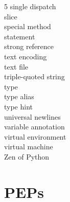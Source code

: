 \documentclass [8pt] {extarticle}
\begin{document}
\begin {multicols} {5}
        single dispatch \\
        slice \\
        special method \\
        statement \\
        strong reference \\
        text encoding \\
        text file \\
        triple-quoted string \\
        type \\
        type alias \\
        type hint \\
        universal newlines \\
        variable annotation \\
        virtual environment \\
        virtual machine \\
        Zen of Python \\
    \end {multicols}

    \section {PEPs}
\end{document}
